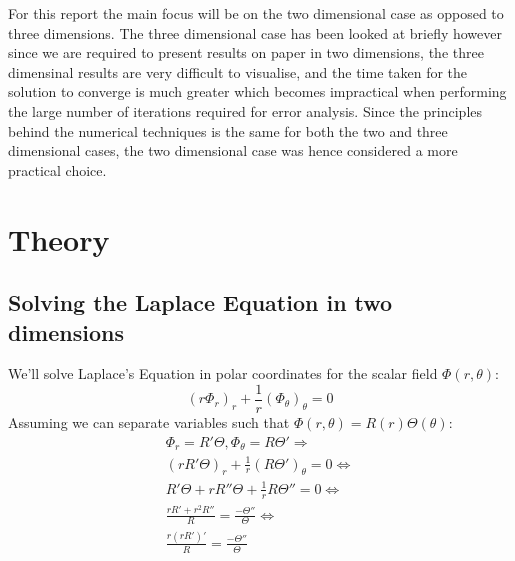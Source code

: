 \documentclass[aps,twocolumn,pre,nofootinbib,10pt]{revtex4-1}
\begin{document}
For this report the main focus will be on the two dimensional case as opposed to three dimensions. The three dimensional case has been looked at briefly however since we are required to present results on paper in two dimensions, the three dimensinal results are very difficult to visualise, and the time taken for the solution to converge is much greater which becomes impractical when performing the large number of iterations required for error analysis. Since the principles behind the numerical techniques is the same for both the two and three dimensional cases, the two dimensional case was hence considered a more practical choice.


\section{Theory \label{sec:the}}

\subsection{Solving the Laplace Equation in two dimensions}
We'll solve Laplace's Equation in polar coordinates for the scalar field $\Phi(r, \theta)$:
\[ \left( r \Phi_r \right)_r + \frac{1}{r} \left(\Phi_\theta \right)_\theta = 0 \]
Assuming we can separate variables such that $\Phi(r, \theta) = R(r)\Theta(\theta)$:
\begin{gather*}
 \Phi_r = R'\Theta, \Phi_\theta = R\Theta' \Rightarrow \\
 (rR'\Theta)_r + \frac{1}{r}(R\Theta')_\theta = 0 \Leftrightarrow \\
 R'\Theta + rR''\Theta + \frac{1}{r}R\Theta'' = 0 \Leftrightarrow \\
 \frac{rR' + r^2 R''}{R} = \frac{- \Theta''}{\Theta} \Leftrightarrow \\
 \frac{r(rR')'}{R} = \frac{- \Theta''}{\Theta}
\end{gather*}
\end{document}
